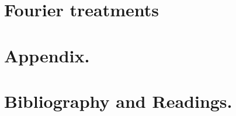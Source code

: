 \documentclass[12pt,leqno]{book}
\begin{document}
\part{Fourier treatments}









\part{Appendix.}






\part{Bibliography and Readings.}




%





%
\end{document}
